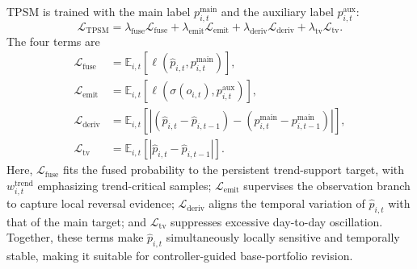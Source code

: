 \documentclass[letterpaper]{article} %
\begin{document}
TPSM is trained with the main label \(p^{\mathrm{main}}_{i,t}\) and the auxiliary label \(p^{\mathrm{aux}}_{i,t}\):
\[
\mathcal L_{\mathrm{TPSM}}
=
\lambda_{\mathrm{fuse}}\mathcal L_{\mathrm{fuse}}
+
\lambda_{\mathrm{emit}}\mathcal L_{\mathrm{emit}}
+
\lambda_{\mathrm{deriv}}\mathcal L_{\mathrm{deriv}}
+
\lambda_{\mathrm{tv}}\mathcal L_{\mathrm{tv}}.
\]
The four terms are
\[
\begin{aligned}
\mathcal L_{\mathrm{fuse}}
&=
\mathbb E_{i,t}\!\left[
\ell\!\left(\hat{p}_{i,t},p^{\mathrm{main}}_{i,t}\right)
\right],
\\
\mathcal L_{\mathrm{emit}}
&=
\mathbb E_{i,t}\!\left[
\ell\!\left(\sigma(o_{i,t}),p^{\mathrm{aux}}_{i,t}\right)
\right],
\\
\mathcal L_{\mathrm{deriv}}
&=
\mathbb E_{i,t}\!\left[
\left|
\left(\hat{p}_{i,t}-\hat{p}_{i,t-1}\right)
-
\left(p^{\mathrm{main}}_{i,t}-p^{\mathrm{main}}_{i,t-1}\right)
\right|
\right],
\\
\mathcal L_{\mathrm{tv}}
&=
\mathbb E_{i,t}\!\left[
\left|\hat{p}_{i,t}-\hat{p}_{i,t-1}\right|
\right].
\end{aligned}
\]
Here, \(\mathcal L_{\mathrm{fuse}}\) fits the fused probability to the persistent trend-support target, with \(w^{\mathrm{trend}}_{i,t}\) emphasizing trend-critical samples; \(\mathcal L_{\mathrm{emit}}\) supervises the observation branch to capture local reversal evidence; \(\mathcal L_{\mathrm{deriv}}\) aligns the temporal variation of \(\hat{p}_{i,t}\) with that of the main target; and \(\mathcal L_{\mathrm{tv}}\) suppresses excessive day-to-day oscillation. Together, these terms make \(\hat{p}_{i,t}\) simultaneously locally sensitive and temporally stable, making it suitable for controller-guided base-portfolio revision.
\end{document}
